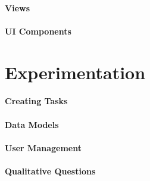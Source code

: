\paragraph{Views}

\paragraph{UI Components}

\section{Experimentation}
\label{sc:section:experimentation}

\paragraph{Creating Tasks}

\paragraph{Data Models}

\paragraph{User Management}

\paragraph{Qualitative Questions}